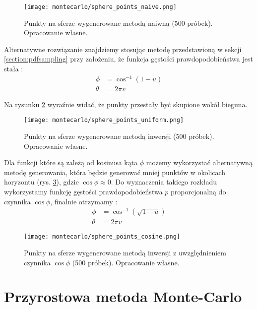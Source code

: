 \documentclass[../main.tex]{subfiles}
\begin{document}
\begin{figure}[h]
    \centering
    \texttt{[image: montecarlo/sphere\_points\_naive.png]}
    \caption{Punkty na sferze wygenerowane metodą naiwną (500 próbek). Opracowanie własne.}
    \label{fig:SpherePointsNaive}
\end{figure}

Alternatywne rozwiązanie znajdziemy stosując metodę przedstawioną w sekcji \ref{section:pdfsampling}  przy założeniu, że funkcja gęstości prawdopodobieństwa jest stała \cite{dammertz_2012, AdvancedCGRenderingEq}:
\begin{align*}
	\phi &= \cos^{-1}(1-u) \\
	\theta &= 2 \pi v
\end{align*}

Na rysunku \ref{fig:SpherePointsUniform} wyraźnie widać, że punkty przestały być skupione wokół bieguna.

\begin{figure}[h]
    \centering
    \texttt{[image: montecarlo/sphere\_points\_uniform.png]}
    \caption{Punkty na sferze wygenerowane metodą inwersji (500 próbek). Opracowanie własne.}
    \label{fig:SpherePointsUniform}
\end{figure}

Dla funkcji które są zależą od kosinusa kąta $\phi$ możemy wykorzystać alternatywną metodę generowania, która będzie generować mniej punktów w okolicach horyzontu (rys. \ref{fig:SpherePointsCosine}), gdzie $\cos\phi \approx 0$. Do wyznaczenia takiego rozkładu wykorzystamy funkcję gęstości prawdopodobieństwa $p$ proporcjonalną do czynnika $\cos \phi$, finalnie otrzymamy \cite{AdvancedCGRenderingEq}:
\begin{align*}
  \phi &= \cos^{-1}(\sqrt{1-u}) \\
  \theta &= 2 \pi v
\end{align*}

\begin{figure}[h]
    \centering
    \texttt{[image: montecarlo/sphere\_points\_cosine.png]}
    \caption{Punkty na sferze wygenerowane metodą inwersji z uwzględnieniem czynnika $\cos\phi$ (500 próbek). Opracowanie własne.}
    \label{fig:SpherePointsCosine}
\end{figure}

\section{Przyrostowa metoda Monte-Carlo}
\end{document}
